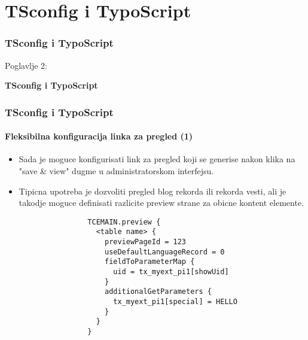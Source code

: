 %

\section{TSconfig i TypoScript}
\begin{frame}[fragile]
	\frametitle{TSconfig i TypoScript}

	\begin{center}\huge{Poglavlje 2:}\end{center}
	\begin{center}\huge{\color{typo3darkgrey}\textbf{TSconfig i TypoScript}}\end{center}

\end{frame}

\begin{frame}[fragile]
	\frametitle{TSconfig i TypoScript}
	\framesubtitle{Fleksibilna konfiguracija linka za pregled  (1)}

	\lstset{basicstyle=\tiny\ttfamily}

	\begin{itemize}

		\item Sada je moguce konfigurisati link za pregled koji se generise nakon klika na\newline
			"save \& view" dugme u administratorskom interfejsu.

		\item Tipicna upotreba je dozvoliti pregled blog rekorda ili rekorda vesti, ali je takodje moguce definisati razlicite preview strane za obicne kontent elemente.

			\begin{lstlisting}
				TCEMAIN.preview {
				  <table name> {
				    previewPageId = 123
				    useDefaultLanguageRecord = 0
				    fieldToParameterMap {
				      uid = tx_myext_pi1[showUid]
				    }
				    additionalGetParameters {
				      tx_myext_pi1[special] = HELLO
				    }
				  }
				}
			\end{lstlisting}

	\end{itemize}

\end{frame}

